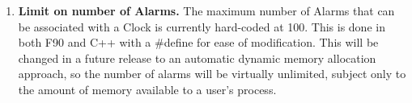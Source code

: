 
\begin{enumerate}

\item {\bf Limit on number of Alarms.}  The maximum number of Alarms that 
can be associated with a Clock is currently hard-coded at 100.  This is done
in both F90 and C++ with a \#define for ease of modification.  This will be
changed in a future release to an automatic dynamic memory allocation approach,
so the number of alarms will be virtually unlimited, subject only to the amount
of memory available to a user's process.

\end{enumerate}
